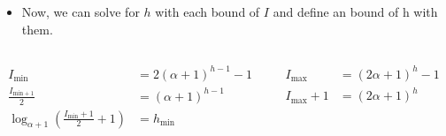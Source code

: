 \begin{frame}
\begin{columns}
    \end{columns}
    \begin{itemize}
        \item Now, we can solve for \(h\) with each bound of \(I\) and define an bound of h with them.
    \end{itemize}
    \begin{columns}
        \begin{column}{0.5\textwidth}
            \begin{block}{}
                \[
                    \begin{aligned}
                        I_{\text{min}} &= 2\left(\alpha + 1\right)^{h - 1} - 1 \\
                        \frac{I_{\text{min} + 1}}{2} &= \left(\alpha + 1\right)^{h - 1} \\
                        \log_{\alpha + 1}\left(\frac{I_{\text{min}} + 1}{2} + 1\right) &= h_{\text{min}}
                    \end{aligned}
                \]
            \end{block}
        \end{column}
        \begin{column}{0.5\textwidth}
            \[
                \begin{aligned}
                    I_{\text{max}} &= \left(2\alpha + 1\right)^h - 1 \\
                    I_{\text{max}} + 1 &= \left(2\alpha + 1\right)^h \\

\end{aligned}\]
\end{column}
\end{columns}
\end{frame}
